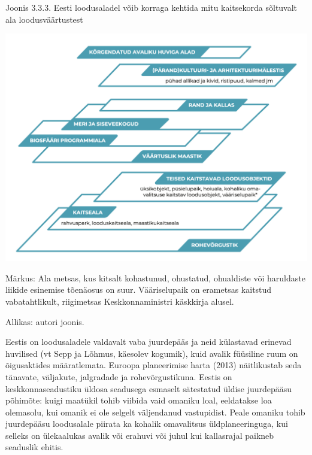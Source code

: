 \documentclass[estonian,]{article}
\begin{document}
{Joonis 3.3.3.} Eesti loodusaladel võib korraga kehtida mitu kaitsekorda sõltuvalt ala loodusväärtustest

\begin{center}\includegraphics[width=1\linewidth]{figures/3-chapter/fig333} \end{center}
\begin{figure-comment}
{Märkus:} Ala metsas, kus kitsalt kohastunud, ohustatud, ohualdiste või
haruldaste liikide esinemise tõenäosus on suur. Vääriselupaik on
erametsas kaitstud vabatahtlikult, riigimetsas Keskkonnaministri
käskkirja alusel.
\end{figure-comment}

\begin{imgsource}
{Allikas:} autori joonis.
\end{imgsource}

Eestis on loodusaladele valdavalt vaba juurdepääs ja neid külastavad erinevad huvilised (vt Sepp ja Lõhmus, käesolev kogumik), kuid avalik füüsiline ruum on õigusaktides määratlemata. Euroopa planeerimise harta (2013) näitlikustab seda tänavate, väljakute, jalgradade ja rohevõrgustikuna. Eestis on keskkonnaseadustiku üldosa seadusega esmaselt sätestatud üldise juurdepääsu põhimõte: kuigi maatükil tohib viibida vaid omaniku loal, eeldatakse loa olemasolu, kui omanik ei ole selgelt väljendanud vastupidist. Peale omaniku tohib juurdepääsu loodusalale piirata ka kohalik omavalitsus üldplaneeringuga, kui selleks on ülekaalukas avalik või erahuvi või juhul kui kallasrajal paikneb seaduslik ehitis.
\end{document}
